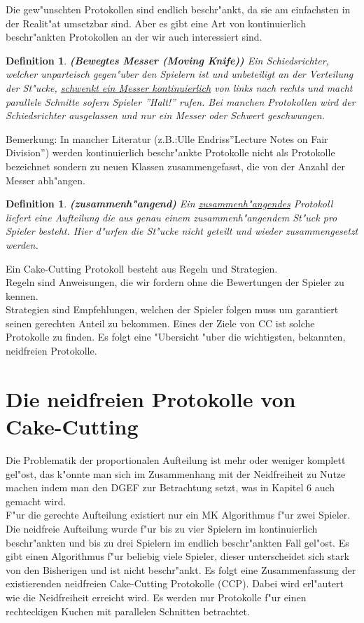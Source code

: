 \documentclass[11pt, a4paper, twoside]{article}
\newtheorem{defi}[satz]{Definition}
\numberwithin{equation}{section}
\begin{document}
Die gew"unschten Protokollen sind endlich beschr"ankt, da sie am einfachsten in der Realit"at umsetzbar sind. Aber es gibt eine Art von kontinuierlich beschr"ankten Protokollen an der wir auch interessiert sind.
\begin{defi}{\textbf{(Bewegtes Messer (Moving Knife))}}
\newline Ein Schiedsrichter, welcher unparteisch gegen"uber den Spielern ist und unbeteiligt an der Verteilung der St"ucke, \underline{schwenkt ein Messer kontinuierlich} von links nach rechts und macht parallele Schnitte sofern Spieler ''Halt!'' rufen. Bei manchen Protokollen wird der Schiedsrichter ausgelassen und nur ein Messer oder Schwert geschwungen.
\end{defi}
Bemerkung: In mancher Literatur (z.B.:Ulle Endriss''Lecture Notes on Fair Division'') werden kontinuierlich beschr"ankte Protokolle nicht als Protokolle bezeichnet sondern zu neuen Klassen zusammengefasst, die von der Anzahl der Messer abh"angen. 
\begin{defi}{\textbf{(zusammenh"angend)}}
\newline Ein \underline{zusammenh"angendes} Protokoll liefert eine Aufteilung die aus genau einem zusammenh"angendem St"uck pro Spieler besteht. Hier d"urfen die St"ucke nicht geteilt und wieder zusammengesetzt werden.
\end{defi}
Ein Cake-Cutting Protokoll besteht aus Regeln und Strategien.\\ Regeln sind  Anweisungen, die wir fordern ohne die Bewertungen der Spieler zu kennen.\\ Strategien sind Empfehlungen, welchen der Spieler folgen muss um garantiert seinen gerechten Anteil zu bekommen.
Eines der Ziele von CC ist solche Protokolle zu finden. Es folgt eine "Ubersicht "uber die wichtigsten, bekannten, neidfreien Protokolle. \section{Die neidfreien Protokolle von Cake-Cutting}
Die Problematik der proportionalen Aufteilung ist mehr oder weniger komplett gel"ost, das k"onnte man sich im Zusammenhang mit der Neidfreiheit zu Nutze machen indem man den DGEF zur Betrachtung setzt, was in Kapitel 6 auch gemacht wird.\\
F"ur die gerechte Aufteilung existiert nur ein MK Algorithmus f"ur zwei Spieler.
Die neidfreie Aufteilung wurde f"ur bis zu vier Spielern im kontinuierlich beschr"ankten und bis zu drei Spielern im endlich beschr"ankten Fall gel"ost. Es gibt einen Algorithmus f"ur beliebig viele Spieler, dieser unterscheidet sich stark von den Bisherigen und ist nicht beschr"ankt.
Es folgt eine Zusammenfassung der existierenden neidfreien Cake-Cutting Protokolle (CCP). Dabei wird erl"autert wie die Neidfreiheit erreicht wird. Es werden nur Protokolle f"ur einen rechteckigen Kuchen mit parallelen Schnitten betrachtet.
\end{document}
